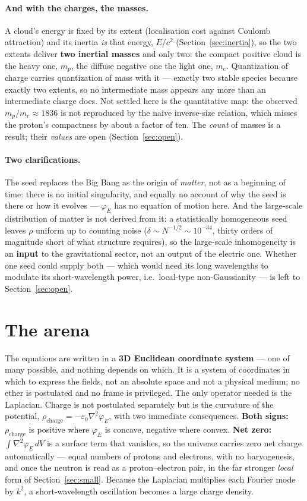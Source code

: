 \documentclass[11pt]{article}
\newcommand{\grad}{\nabla}
\begin{document}
\paragraph{And with the charges, the masses.} A cloud's energy is fixed by its extent (localisation cost against
Coulomb attraction) and its inertia \emph{is} that energy, $E/c^2$ (Section~\ref{sec:inertia}), so the two extents
deliver \textbf{two inertial masses} and only two: the compact positive cloud is the heavy one, $m_p$, the diffuse
negative one the light one, $m_e$. Quantization of charge carries quantization of mass with it --- exactly two
stable species because exactly two extents, so no intermediate mass appears any more than an intermediate charge
does. Not settled here is the quantitative map: the observed $m_p/m_e\approx1836$ is not reproduced by the naive
inverse-size relation, which misses the proton's compactness by about a factor of ten. The \emph{count} of masses
is a result; their \emph{values} are open (Section~\ref{sec:open}).

\paragraph{Two clarifications.} The seed replaces the Big Bang as the origin of \emph{matter}, not as a beginning
of time: there is no initial singularity, and equally no account of why the seed is there or how it evolves ---
$\varphi_E$ has no equation of motion here. And the large-scale distribution of matter is not derived from it: a
statistically homogeneous seed leaves $\rho$ uniform up to counting noise ($\delta\sim N^{-1/2}\sim10^{-34}$,
thirty orders of magnitude short of what structure requires), so the large-scale inhomogeneity is an
\textbf{input} to the gravitational sector, not an output of the electric one. Whether one seed could supply both
--- which would need its long wavelengths to modulate its short-wavelength power, i.e.\ local-type
non-Gaussianity --- is left to Section~\ref{sec:open}.

\section{The arena}\label{sec:seed}
The equations are written in a \textbf{3D Euclidean coordinate system} --- one of many possible, and nothing
depends on which. It is a system of coordinates in which to express the fields, not an absolute space and not a
physical medium; no ether is postulated and no frame is privileged. The only operator needed is the Laplacian. Charge is not postulated separately but is the curvature of the
potential, $\rho_{\text{charge}}=-\varepsilon_0\grad^2\varphi_E$, with two immediate consequences. \textbf{Both
signs:} $\rho_{\text{charge}}$ is positive where $\varphi_E$ is concave, negative where convex. \textbf{Net zero:}
$\int\grad^2\varphi_E\,dV$ is a surface term that vanishes, so the universe carries zero net charge automatically
--- equal numbers of protons and electrons, with no baryogenesis, and once the neutron is read as a
proton--electron pair, in the far stronger \emph{local} form of Section~\ref{sec:small}. Because the Laplacian
multiplies each Fourier mode by $k^2$, a short-wavelength oscillation becomes a large charge density.
\end{document}
